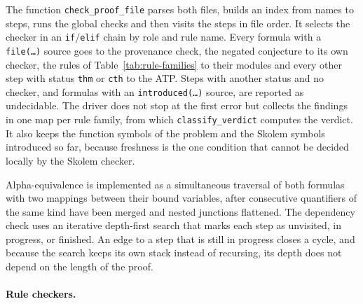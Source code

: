 The function \texttt{check\_proof\_file} parses both files, builds an index from names to steps, runs the global checks and then visits the steps in file order.
It selects the checker in an \texttt{if}/\texttt{elif} chain by role and rule name. Every formula with a \texttt{file(\dots)} source goes to the provenance check, the negated conjecture to its own checker, the rules of Table~\ref{tab:rule-families} to their modules and every other step with status \texttt{thm} or \texttt{cth} to the ATP.
Steps with another status and no checker, and formulas with an \texttt{introduced(\dots)} source, are reported as undecidable.
The driver does not stop at the first error but collects the findings in one map per rule family, from which \texttt{classify\_verdict} computes the verdict.
It also keeps the function symbols of the problem and the Skolem symbols introduced so far, because freshness is the one condition that cannot be decided locally by the Skolem checker.

Alpha-equivalence is implemented as a simultaneous traversal of both formulas with two mappings between their bound variables, after consecutive quantifiers of the same kind have been merged and nested junctions flattened.
The dependency check uses an iterative depth-first search that marks each step as unvisited, in progress, or finished. An edge to a step that is still in progress closes a cycle, and because the search keeps its own stack instead of recursing, its depth does not depend on the length of the proof.

\paragraph{Rule checkers.}
\label{subsec:impl-checkers}


